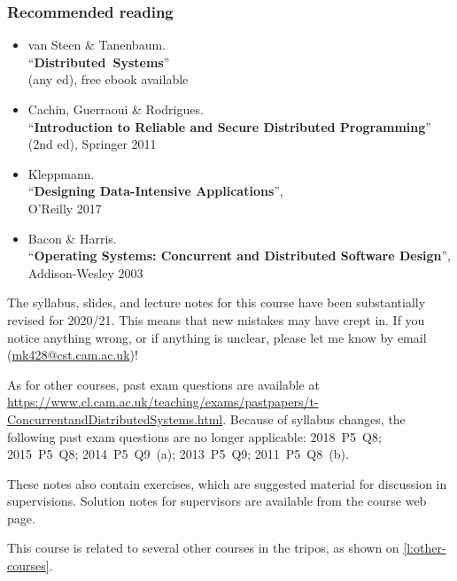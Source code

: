 \begin{frame}
    \label{s:reading}
    \frametitle{Recommended reading}
    \begin{itemize}
        \item van Steen \& Tanenbaum.\\ ``\textbf{Distributed Systems}''\\(any ed), free ebook available
        \item Cachin, Guerraoui \& Rodrigues. \\ ``\textbf{Introduction to Reliable and Secure Distributed Programming}'' (2nd ed), Springer 2011
        \item Kleppmann.\\ ``\textbf{Designing Data-Intensive Applications}'',\\O’Reilly 2017
        \item Bacon \& Harris.\\ ``\textbf{Operating Systems: Concurrent and Distributed Software Design}'', Addison-Wesley 2003
    \end{itemize}
\end{frame}

The syllabus, slides, and lecture notes for this course have been substantially revised for 2020/21.
This means that new mistakes may have crept in.
If you notice anything wrong, or if anything is unclear, please let me know by email (\url{mk428@cst.cam.ac.uk})!

As for other courses, past exam questions are available at \url{https://www.cl.cam.ac.uk/teaching/exams/pastpapers/t-ConcurrentandDistributedSystems.html}.
Because of syllabus changes, the following past exam questions are no longer applicable: 2018~P5~Q8; 2015~P5~Q8; 2014~P5~Q9~(a); 2013~P5~Q9; 2011~P5~Q8~(b).

These notes also contain exercises, which are suggested material for discussion in supervisions.
Solution notes for supervisors are available from the course web page.

This course is related to several other courses in the tripos, as shown on \autoref{l:other-courses}.


